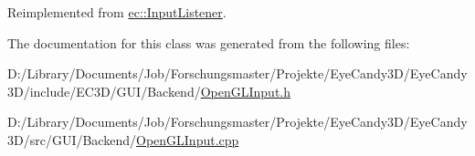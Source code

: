 Reimplemented from \mbox{\hyperlink{classec_1_1_input_listener_a9ceaefc79c6b0b260e88454616137840}{ec\+::\+Input\+Listener}}.



The documentation for this class was generated from the following files\+:\begin{DoxyCompactItemize}
\item 
D\+:/\+Library/\+Documents/\+Job/\+Forschungsmaster/\+Projekte/\+Eye\+Candy3\+D/\+Eye\+Candy3\+D/include/\+E\+C3\+D/\+G\+U\+I/\+Backend/\mbox{\hyperlink{_open_g_l_input_8h}{Open\+G\+L\+Input.\+h}}\item 
D\+:/\+Library/\+Documents/\+Job/\+Forschungsmaster/\+Projekte/\+Eye\+Candy3\+D/\+Eye\+Candy3\+D/src/\+G\+U\+I/\+Backend/\mbox{\hyperlink{_open_g_l_input_8cpp}{Open\+G\+L\+Input.\+cpp}}\end{DoxyCompactItemize}
